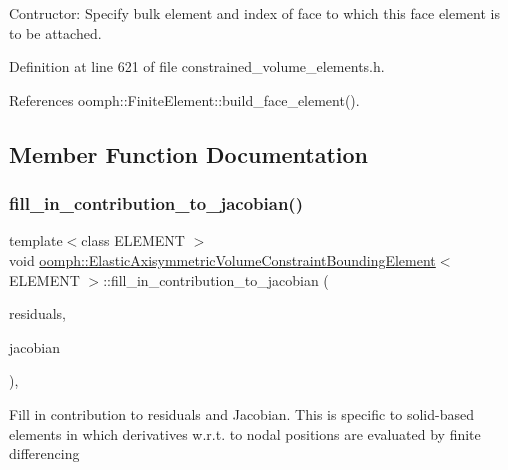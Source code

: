 Contructor\+: Specify bulk element and index of face to which this face element is to be attached. 



Definition at line 621 of file constrained\+\_\+volume\+\_\+elements.\+h.



References oomph\+::\+Finite\+Element\+::build\+\_\+face\+\_\+element().



\subsection{Member Function Documentation}
\mbox{\label{classoomph_1_1ElasticAxisymmetricVolumeConstraintBoundingElement_adc7f5296f867251fe4b97b01f40c11e7}} 
\subsubsection{\texorpdfstring{fill\+\_\+in\+\_\+contribution\+\_\+to\+\_\+jacobian()}{fill\_in\_contribution\_to\_jacobian()}}
{\footnotesize\ttfamily template$<$class E\+L\+E\+M\+E\+NT $>$ \\
void \hyperlink{classoomph_1_1ElasticAxisymmetricVolumeConstraintBoundingElement}{oomph\+::\+Elastic\+Axisymmetric\+Volume\+Constraint\+Bounding\+Element}$<$ E\+L\+E\+M\+E\+NT $>$\+::fill\+\_\+in\+\_\+contribution\+\_\+to\+\_\+jacobian (\begin{DoxyParamCaption}\item[{\hyperlink{classoomph_1_1Vector}{Vector}$<$ double $>$ \&}]{residuals,  }\item[{\hyperlink{classoomph_1_1DenseMatrix}{Dense\+Matrix}$<$ double $>$ \&}]{jacobian }\end{DoxyParamCaption})\hspace{0.3cm}{\ttfamily [inline]}, {\ttfamily [virtual]}}

Fill in contribution to residuals and Jacobian. This is specific to solid-\/based elements in which derivatives w.\+r.\+t. to nodal positions are evaluated by finite differencing 

